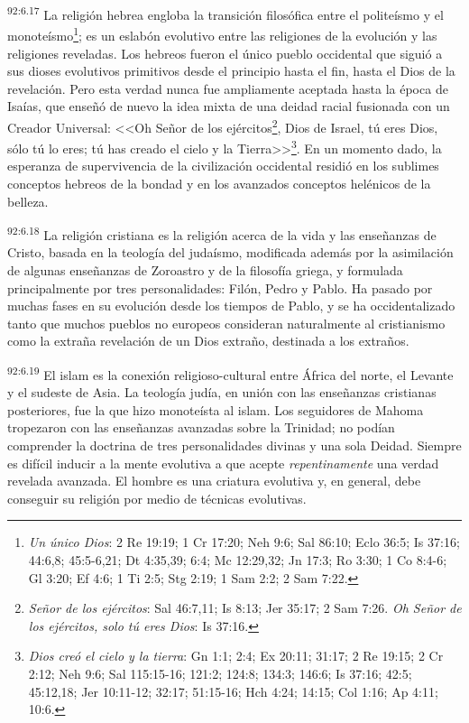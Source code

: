 \documentclass[twoside, 11pt]{book}
\begin{document}
\par
\textsuperscript{92:6.17} La religión hebrea engloba la transición filosófica entre el politeísmo y el monoteísmo\footnote{\textit{Un único Dios}: 2 Re 19:19; 1 Cr 17:20; Neh 9:6; Sal 86:10; Eclo 36:5; Is 37:16; 44:6,8; 45:5-6,21; Dt 4:35,39; 6:4; Mc 12:29,32; Jn 17:3; Ro 3:30; 1 Co 8:4-6; Gl 3:20; Ef 4:6; 1 Ti 2:5; Stg 2:19; 1 Sam 2:2; 2 Sam 7:22.}; es un eslabón evolutivo entre las religiones de la evolución y las religiones reveladas. Los hebreos fueron el único pueblo occidental que siguió a sus dioses evolutivos primitivos desde el principio hasta el fin, hasta el Dios de la revelación. Pero esta verdad nunca fue ampliamente aceptada hasta la época de Isaías, que enseñó de nuevo la idea mixta de una deidad racial fusionada con un Creador Universal: <<Oh Señor de los ejércitos\footnote{\textit{Señor de los ejércitos}: Sal 46:7,11; Is 8:13; Jer 35:17; 2 Sam 7:26. \textit{Oh Señor de los ejércitos, solo tú eres Dios}: Is 37:16.}, Dios de Israel, tú eres Dios, sólo tú lo eres; tú has creado el cielo y la Tierra>>\footnote{\textit{Dios creó el cielo y la tierra}: Gn 1:1; 2:4; Ex 20:11; 31:17; 2 Re 19:15; 2 Cr 2:12; Neh 9:6; Sal 115:15-16; 121:2; 124:8; 134:3; 146:6; Is 37:16; 42:5; 45:12,18; Jer 10:11-12; 32:17; 51:15-16; Hch 4:24; 14:15; Col 1:16; Ap 4:11; 10:6.}. En un momento dado, la esperanza de supervivencia de la civilización occidental residió en los sublimes conceptos hebreos de la bondad y en los avanzados conceptos helénicos de la belleza.

\par
\textsuperscript{92:6.18} La religión cristiana es la religión acerca de la vida y las enseñanzas de Cristo, basada en la teología del judaísmo, modificada además por la asimilación de algunas enseñanzas de Zoroastro y de la filosofía griega, y formulada principalmente por tres personalidades: Filón, Pedro y Pablo. Ha pasado por muchas fases en su evolución desde los tiempos de Pablo, y se ha occidentalizado tanto que muchos pueblos no europeos consideran naturalmente al cristianismo como la extraña revelación de un Dios extraño, destinada a los extraños.

\par
\textsuperscript{92:6.19} El islam es la conexión religioso-cultural entre África del norte, el Levante y el sudeste de Asia. La teología judía, en unión con las enseñanzas cristianas posteriores, fue la que hizo monoteísta al islam. Los seguidores de Mahoma tropezaron con las enseñanzas avanzadas sobre la Trinidad; no podían comprender la doctrina de tres personalidades divinas y una sola Deidad. Siempre es difícil inducir a la mente evolutiva a que acepte \textit{repentinamente} una verdad revelada avanzada. El hombre es una criatura evolutiva y, en general, debe conseguir su religión por medio de técnicas evolutivas.
\end{document}
